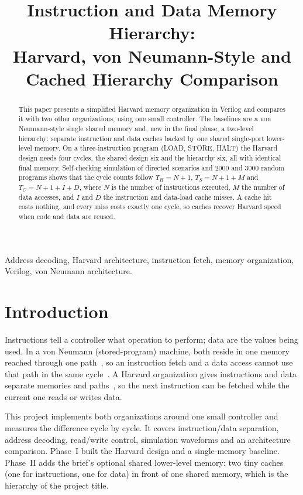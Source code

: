 \documentclass[conference,a4paper]{IEEEtran}
\title{Instruction and Data Memory Hierarchy:\\Harvard, von Neumann-Style and Cached Hierarchy Comparison}
\author{\IEEEauthorblockN{Pranjal Modi, Sarvjeet Yadav, Abhishek Tripathi,\\
Sameer Khan and Suryansh Singh}
\IEEEauthorblockA{Team Architec, Section A --- MCA Project 9, 2026\\
Newton School of Technology, Rishihood University\\
suryansh.singh2024@nst.rishihood.edu.in}}
\begin{document}
\maketitle

\begin{abstract}
This paper presents a simplified Harvard memory organization in Verilog and
compares it with two other organizations, using one small controller. The
baselines are a von Neumann-style single shared memory and, new in the final
phase, a two-level hierarchy: separate instruction and data caches
backed by one shared single-port lower-level memory. On a
three-instruction program (LOAD, STORE, HALT) the Harvard design needs four
cycles, the shared design six and the hierarchy six, all with identical
final memory. Self-checking simulation of directed scenarios and 2000 and 3000
random programs shows that the cycle counts follow $T_H=N+1$,
$T_S=N+1+M$ and $T_C=N+1+I+D$, where $N$ is the number of instructions
executed, $M$ the number of data accesses, and $I$ and $D$ the instruction
and data-load cache misses. A cache hit costs nothing, and every miss costs
exactly one cycle, so caches recover Harvard speed when code and data are
reused.
\end{abstract}

\begin{IEEEkeywords}
Address decoding, Harvard architecture, instruction fetch, memory
organization, Verilog, von Neumann architecture.
\end{IEEEkeywords}

\section{Introduction}
Instructions tell a controller what operation to perform; data are the
values being used. In a von Neumann (stored-program) machine, both reside
in one memory reached through one path~\cite{vonneumann}, so an
instruction fetch and a data access cannot use that path in the same
cycle~\cite{backus}. A Harvard organization gives instructions and data
separate memories and paths~\cite{aiken}, so the next instruction can be
fetched while the current one reads or writes data.

This project implements both organizations around one small controller
and measures the difference cycle by cycle. It covers instruction/data
separation, address decoding, read/write control, simulation waveforms and
an architecture comparison. Phase~I built the Harvard design and a
single-memory baseline. Phase~II adds the brief's optional shared lower-level
memory: two tiny caches (one for instructions, one for data) in front of one
shared memory, which is the hierarchy of the project title.
\end{document}

